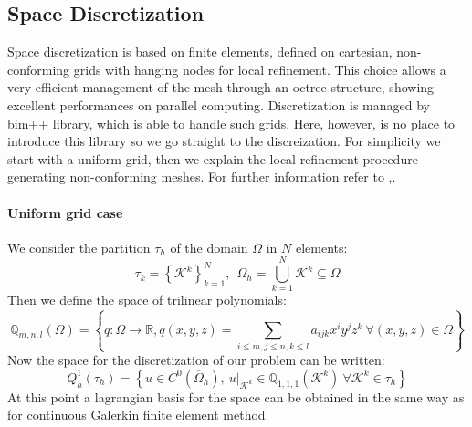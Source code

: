 \documentclass[11pt,a4paper]{article}
\begin{document}
\subsection{Space Discretization}
Space discretization is based on finite elements, defined on cartesian, non-conforming grids with hanging nodes for local refinement. This choice allows a very efficient management of the mesh through an octree structure, showing excellent performances on parallel computing.
Discretization is managed by bim++ library, which is able to handle such grids. Here, however, is no place to introduce this library so we go straight to the discreization. For simplicity we start with a uniform grid, then we explain the local-refinement procedure generating non-conforming meshes. For further information refer to \cite{africa2022scalable},\cite{thesis-pasquale-africa}. 
\paragraph{Uniform grid case}
We consider the partition \(\tau_h\) of the domain \(\Omega\) in \(N\) elements:
\begin{equation}
	\tau_k=\left\{\mathcal{K}^k\right\}_{k=1}^N,\ \ \Omega_h=\bigcup_{k=1}^N \mathcal{K}^k \subseteq \Omega
\end{equation}
Then we define the space of trilinear polynomials:
\begin{equation}
	\mathbb{Q}_{m,n,l}(\Omega)=\left\{q:\Omega\rightarrow\mathbb{R}, q(x,y,z)=\sum_{i\leq m,j\leq n,k\leq l}a_{ijk}x^iy^jz^k\ \forall (x,y,z)\in\Omega \right\}
\end{equation}
Now the space for the discretization of our problem can be written:
\begin{equation}
	Q_h^1(\tau_h) = \left\{u\in C^0\left(\overline{\Omega}_h\right),\ u|_{\mathcal{K}^k}\in\mathbb{Q}_{1,1,1}\left(\mathcal{K}^k\right)\ \forall \mathcal{K}^k\in \tau_h \right\}
\end{equation}
At this point a lagrangian basis for the space can be obtained in the same way as for continuous Galerkin finite element method.
\end{document}
